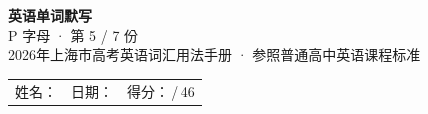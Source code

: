 \documentclass[10pt,a4paper]{article}
\begin{document}
\pagestyle{plain}

\begin{center}
{\LARGE\bfseries 英语单词默写}\\[0.22em]
{\large P 字母 · 第 5 / 7 份}\\[0.18em]
{\small 2026年上海市高考英语词汇用法手册 · 参照普通高中英语课程标准}
\end{center}

\vspace{0.25em}
\noindent\begin{tabular}{@{}p{}@{}p{}@{}p{}@{}}
姓名：\underline{\hspace{2.0cm}} & 日期：\underline{\hspace{2.0cm}} & 得分：\underline{\hspace{1.3cm}}\,/\,46 \\
\end{tabular}

\vspace{0.3em}

\vspace{0.08em}
\end{document}
